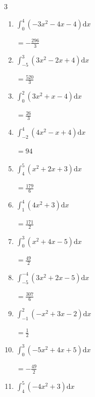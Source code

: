 \begin{multicols}{3}
\begin{enumerate}
        $\displaystyle =-\frac{124}{3}$

  \item $\displaystyle \int_{0}^{4}\left( -3x^{2}-4x-4 \right) \mathrm{d}x$

        $\displaystyle =-\frac{296}{3}$

  \item $\displaystyle \int_{-5}^{3}\left( 3x^{2}-2x+4 \right) \mathrm{d}x$

        $\displaystyle =\frac{520}{3}$

  \item $\displaystyle \int_{0}^{2}\left( 3x^{2}+x-4 \right) \mathrm{d}x$

        $\displaystyle =\frac{26}{3}$

  \item $\displaystyle \int_{-2}^{4}\left( 4x^{2}-x+4 \right) \mathrm{d}x$

        $\displaystyle =94$

\columnbreak %

  \item $\displaystyle \int_{4}^{5}\left( x^{2}+2x+3 \right) \mathrm{d}x$

        $\displaystyle =\frac{179}{6}$

  \item $\displaystyle \int_{1}^{4}\left( 4x^{2}+3 \right) \mathrm{d}x$

        $\displaystyle =\frac{171}{2}$

  \item $\displaystyle \int_{0}^{3}\left( x^{2}+4x-5 \right) \mathrm{d}x$

        $\displaystyle =\frac{49}{2}$

  \item $\displaystyle \int_{-5}^{-4}\left( 3x^{2}+2x-5 \right) \mathrm{d}x$

        $\displaystyle =\frac{307}{6}$

  \item $\displaystyle \int_{-1}^{2}\left( -x^{2}+3x-2 \right) \mathrm{d}x$

        $\displaystyle =\frac{1}{2}$

\columnbreak %

  \item $\displaystyle \int_{0}^{3}\left( -5x^{2}+4x+5 \right) \mathrm{d}x$

        $\displaystyle =-\frac{49}{2}$

  \item $\displaystyle \int_{4}^{5}\left( -4x^{2}+3 \right) \mathrm{d}x$


\end{enumerate}
\end{multicols}
